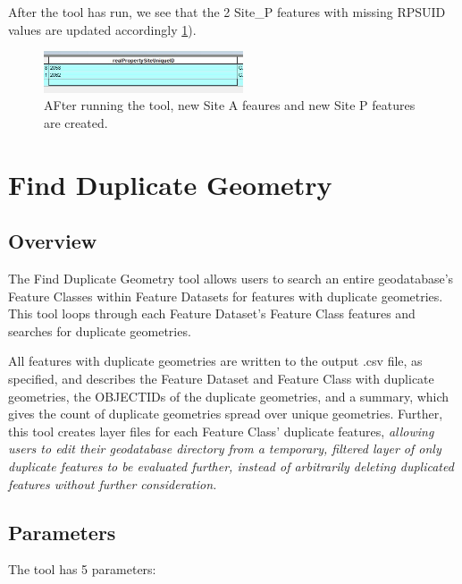 \documentclass[openany]{book}
\theoremstyle{definition}
\theoremstyle{definition}
\theoremstyle{definition}
\theoremstyle{remark}
\begin{document}
After the tool has run, we see that the 2 Site\_P features with missing
RPSUID values are updated accordingly \ref{fig:sjcafter}).

\begin{figure}[H]

{\centering \includegraphics[width=2.32in,]{figures/spatjoinCalc-after} 

}

\caption{AFter running the tool, new Site A feaures and new Site P features are created.}\label{fig:sjcafter}
\end{figure}

\hypertarget{dupGeom}{\chapter{Find Duplicate Geometry}\label{dupGeom}}

\section{Overview}\label{overview-3}

The Find Duplicate Geometry tool allows users to search an entire
geodatabase's Feature Classes within Feature Datasets for features with
duplicate geometries. This tool loops through each Feature Dataset's
Feature Class features and searches for duplicate geometries.

All features with duplicate geometries are written to the output .csv
file, as specified, and describes the Feature Dataset and Feature Class
with duplicate geometries, the OBJECTIDs of the duplicate geometries,
and a summary, which gives the count of duplicate geometries spread over
unique geometries. Further, this tool creates layer files for each
Feature Class' duplicate features, \emph{allowing users to edit their
geodatabase directory from a temporary, filtered layer of only duplicate
features to be evaluated further, instead of arbitrarily deleting
duplicated features without further consideration.}

\section{Parameters}\label{parameters-3}

The tool has 5 parameters:
\end{document}
